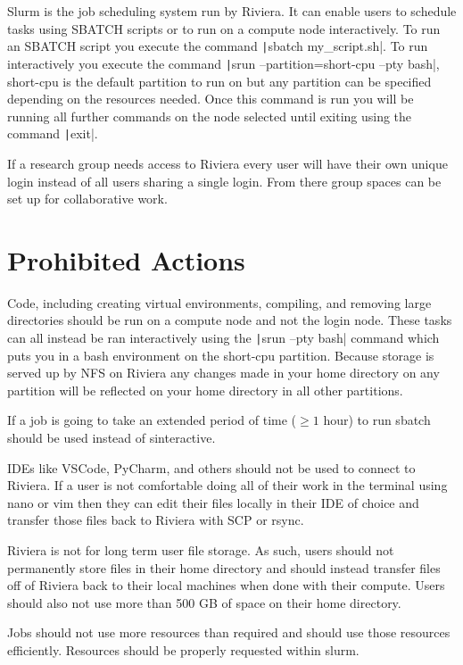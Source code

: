 \documentclass[11pt,letterpaper]{article}
\begin{document}
\begin{description}[noitemsep]
    \item[Slurm] Slurm is the job scheduling system run by Riviera. It can enable users to schedule tasks using SBATCH scripts or to run on a compute node interactively. To run an SBATCH script you execute the command \texttt|sbatch my_script.sh|. To run interactively you execute the command \texttt|srun --partition=short-cpu --pty bash|, short-cpu is the default partition to run on but any partition can be specified depending on the resources needed. Once this command is run you will be running all further commands on the node selected until exiting using the command \texttt|exit|. 
    \item[Group Access] If a research group needs access to Riviera every user will have their own unique login instead of all users sharing a single login. From there group spaces can be set up for collaborative work. 
\end{description}

\section{Prohibited Actions}
\begin{description}[noitemsep]
    \item[Running Code on Login] Code, including creating virtual environments, compiling, and removing large directories should be run on a compute node and not the login node. These tasks can all instead be ran interactively using the \texttt|srun --pty bash| command which puts you in a bash environment on the short-cpu partition. Because storage is served up by NFS on Riviera any changes made in your home directory on any partition will be reflected on your home directory in all other partitions.
    \item[Long running sinteractive jobs] If a job is going to take an extended period of time (\(\geq 1\) hour) to run sbatch should be used instead of sinteractive.
    \item[Connecting with an IDE] IDEs like VSCode, PyCharm, and others should not be used to connect to Riviera. If a user is not comfortable doing all of their work in the terminal using nano or vim then they can edit their files locally in their IDE of choice and transfer those files back to Riviera with SCP or rsync.
    \item[Long term file storage] Riviera is not for long term user file storage. As such, users should not permanently store files in their home directory and should instead transfer files off of Riviera back to their local machines when done with their compute. Users should also not use more than 500 GB of space on their home directory.
    \item[Improper Resource Usage] Jobs should not use more resources than required and should use those resources efficiently. Resources should be properly requested within slurm.
\end{description}
\end{document}
